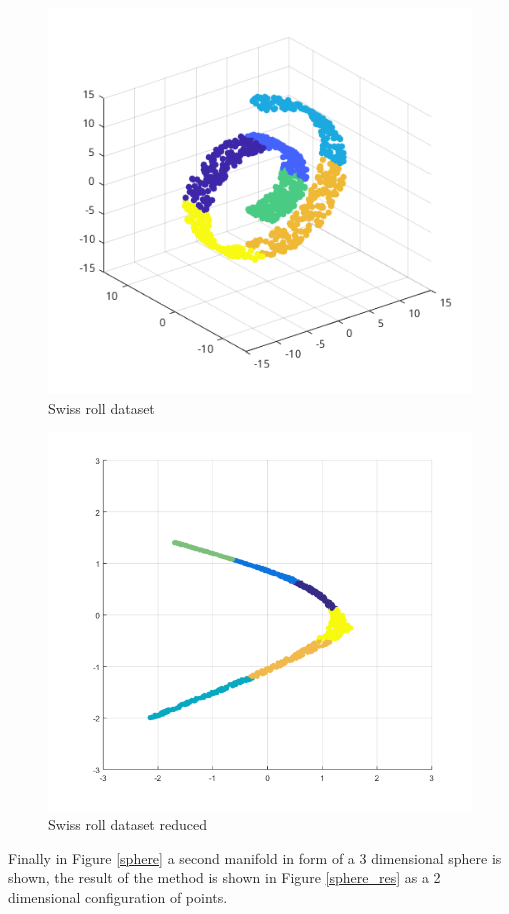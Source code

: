 \documentclass[12pt,journal]{IEEEtran}
\begin{document}
\begin{figure}[H]
    \centering
    \includegraphics[width=0.8\linewidth]{images/swiss_roll.png}
    \caption{Swiss roll dataset}
    \label{swiss}
\end{figure}

\begin{figure}[H]
    \centering
    \includegraphics[width=0.7\linewidth]{images/swiss_roll_result.png}
    \caption{Swiss roll dataset reduced}
    \label{swiss_res}
\end{figure}

Finally in Figure \ref{sphere} a second manifold in form of a 3 dimensional
sphere is shown, the result of the method is shown in Figure \ref{sphere_res}
as a 2 dimensional configuration of points.
\end{document}
